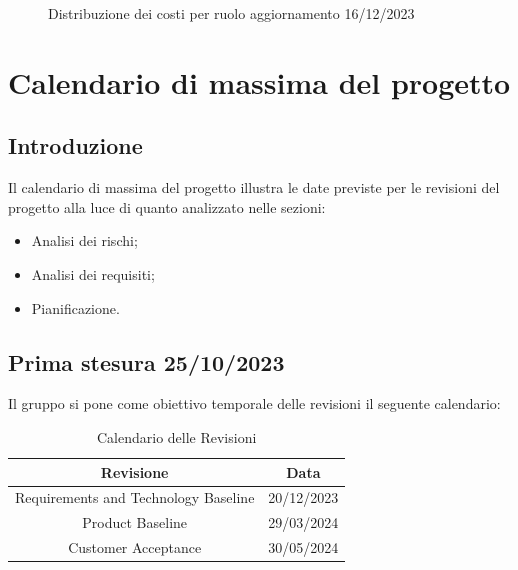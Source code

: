 \documentclass{article}
\begin{document}
    \begin{figure}[h]
        \centering
        \caption{Distribuzione dei costi per ruolo aggiornamento 16/12/2023}
    \end{figure}


\section{Calendario di massima del progetto}
\subsection{Introduzione}
Il calendario di massima del progetto illustra le date previste per le revisioni del progetto
alla luce di quanto analizzato nelle sezioni:
\begin{itemize}
    \item Analisi dei rischi;
    \item Analisi dei requisiti;
    \item Pianificazione.
\end{itemize}
\subsection{Prima stesura 25/10/2023}
Il gruppo si pone come obiettivo temporale delle revisioni il seguente calendario:
\begin{table}[ht]
    \centering
    \begin{tabular}{|c|c|}
        \hline
        \textbf{Revisione}                   & \textbf{Data} \\
        \hline
        Requirements and Technology Baseline & 20/12/2023    \\
        Product Baseline                     & 29/03/2024    \\
        Customer Acceptance                  & 30/05/2024    \\
        \hline
    \end{tabular}
    \caption{Calendario delle Revisioni}
\end{table}
\end{document}
